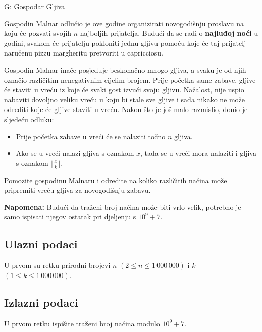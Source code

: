 \begin{statement}[
  timelimit=1 s,
  memorylimit=512 MiB,
]{G: Gospodar Gljiva}

Gospodin Malnar odlučio je ove godine organizirati novogodišnju proslavu na
koju će pozvati svojih $n$ najboljih prijatelja. Budući da se radi o
\textbf{najluđoj noći} u godini, svakom će prijatelju pokloniti jednu gljivu
pomoću koje će taj prijatelj naručenu pizzu margheritu pretvoriti u capricciosu.

Gospodin Malnar inače posjeduje beskonačno mnogo gljiva, a svaku je od njih
označio različitim nenegativnim cijelim brojem. Prije početka same zabave,
gljive će staviti u vreću iz koje će svaki gost izvući svoju gljivu.
Nažalost, nije uspio nabaviti dovoljno veliku vreću u koju bi stale sve
gljive i sada nikako ne može odrediti koje će gljive staviti u vreću. Nakon
što je još malo razmislio, donio je sljedeću odluku:

\begin{itemize}
    \item Prije početka zabave u vreći će se nalaziti točno $n$ gljiva.
    \item Ako se u vreći nalazi gljiva s oznakom $x$, tada se u vreći mora
      nalaziti i gljiva s oznakom $\lfloor \frac{x}{k} \rfloor$.
\end{itemize}

Pomozite gospodinu Malnaru i odredite na koliko različitih načina može
pripremiti vreću gljiva za novogodišnju zabavu.

\textbf{Napomena:} Budući da traženi broj načina može biti vrlo velik, potrebno
je samo ispisati njegov ostatak pri djeljenju s $10^9+7$.

\subsection*{Ulazni podaci}
U prvom su retku prirodni brojevi $n$ $(2 \le n \le 1\,000\,000)$ i $k$
$(1 \le k \le 1\,000\,000)$.

\subsection*{Izlazni podaci}
U prvom retku ispišite traženi broj načina modulo $10^9 + 7$.


\end{statement}

